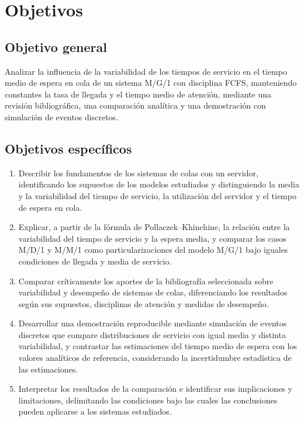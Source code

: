 
\section{Objetivos}
\label{sec:objetivos}

\subsection{Objetivo general}
\label{subsec:objetivo-general}

Analizar la influencia de la variabilidad de los tiempos de servicio en el tiempo medio de espera en cola de un sistema M/G/1 con disciplina FCFS, manteniendo constantes la tasa de llegada y el tiempo medio de atención, mediante una revisión bibliográfica, una comparación analítica y una demostración con simulación de eventos discretos.

\subsection{Objetivos específicos}
\label{subsec:objetivos-especificos}

\begin{enumerate}
  \item Describir los fundamentos de los sistemas de colas con un servidor, identificando los supuestos de los modelos estudiados y distinguiendo la media y la variabilidad del tiempo de servicio, la utilización del servidor y el tiempo de espera en cola.

  \item Explicar, a partir de la fórmula de Pollaczek--Khinchine, la relación entre la variabilidad del tiempo de servicio y la espera media, y comparar los casos M/D/1 y M/M/1 como particularizaciones del modelo M/G/1 bajo iguales condiciones de llegada y media de servicio.

  \item Comparar críticamente los aportes de la bibliografía seleccionada sobre variabilidad y desempeño de sistemas de colas, diferenciando los resultados según sus supuestos, disciplinas de atención y medidas de desempeño.

  \item Desarrollar una demostración reproducible mediante simulación de eventos discretos que compare distribuciones de servicio con igual media y distinta variabilidad, y contrastar las estimaciones del tiempo medio de espera con los valores analíticos de referencia, considerando la incertidumbre estadística de las estimaciones.

  \item Interpretar los resultados de la comparación e identificar sus implicaciones y limitaciones, delimitando las condiciones bajo las cuales las conclusiones pueden aplicarse a los sistemas estudiados.
\end{enumerate}
